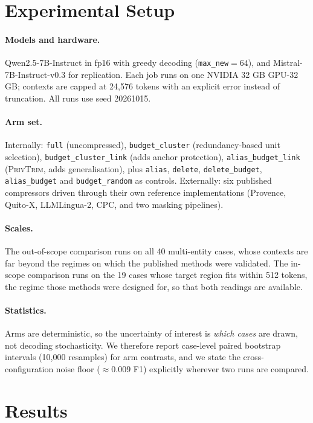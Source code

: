 \documentclass[conference]{IEEEtran}
\newcommand{\ours}{\textsc{PrivTrim}}
\newcommand{\arm}[1]{\texttt{#1}}
\begin{document}
\section{Experimental Setup}
\label{sec:setup}

\paragraph{Models and hardware.}
Qwen2.5-7B-Instruct in fp16 with greedy decoding (\arm{max\_new}$=64$), and
Mistral-7B-Instruct-v0.3 for replication. Each job runs on one NVIDIA 32 GB GPU-32\,GB; contexts
are capped at 24{,}576 tokens with an explicit error instead of truncation. All runs use seed
20261015.

\paragraph{Arm set.}
Internally: \arm{full} (uncompressed), \arm{budget\_cluster} (redundancy-based unit selection),
\arm{budget\_cluster\_link} (adds anchor protection), \arm{alias\_budget\_link} (\ours, adds
generalisation), plus \arm{alias}, \arm{delete}, \arm{delete\_budget}, \arm{alias\_budget} and
\arm{budget\_random} as controls. Externally: six published compressors driven through their own
reference implementations (Provence, Quito-X, LLMLingua-2, CPC, and two masking pipelines).

\paragraph{Scales.}
The out-of-scope comparison runs on all 40 multi-entity cases, whose contexts are far beyond
the regimes on which the published methods were validated. The in-scope comparison runs on the
19 cases whose target region fits within 512 tokens, the regime those methods were designed
for, so that both readings are available.

\paragraph{Statistics.}
Arms are deterministic, so the uncertainty of interest is \emph{which cases} are drawn, not
decoding stochasticity. We therefore report case-level paired bootstrap intervals (10{,}000
resamples) for arm contrasts, and we state the cross-configuration noise floor
($\approx 0.009$ F1) explicitly wherever two runs are compared.

\section{Results}
\label{sec:res}
\end{document}
